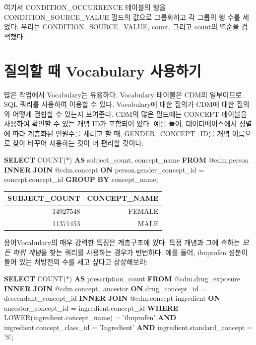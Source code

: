 \documentclass[10.5pt]{book}
\newenvironment{Shaded}{\begin{snugshade}}{\end{snugshade}}
\newcommand{\KeywordTok}[1]{\textcolor[rgb]{0.13,0.29,0.53}{\textbf{#1}}}
\newcommand{\StringTok}[1]{\textcolor[rgb]{0.31,0.60,0.02}{#1}}
\newcommand{\FunctionTok}[1]{\textcolor[rgb]{0.00,0.00,0.00}{#1}}
\newcommand{\NormalTok}[1]{#1}
\theoremstyle{definition}
\theoremstyle{definition}
\theoremstyle{definition}
\theoremstyle{remark}
\begin{document}
여기서 CONDITION\_OCCURRENCE 테이블의 행을 CONDITION\_SOURCE\_VALUE
필드의 값으로 그룹화하고 각 그룹의 행 수를 세었다. 우리는
CONDITION\_SOURCE\_VALUE, count, 그리고 count의 역순을 검색했다.

\section{질의할 때 Vocabulary 사용하기}\label{--vocabulary-}

많은 작업에서 Vocabulary는 유용하다. Vocabulary 테이블은 CDM의
일부이므로 SQL 쿼리를 사용하여 이용할 수 있다. Vocabulary에 대한 질의가
CDM에 대한 질의와 어떻게 결합할 수 있는지 보여준다. CDM의 많은 필드에는
CONCEPT 테이블을 사용하여 확인할 수 있는 개념 ID가 포함되어 있다. 예를
들어, 데이터베이스에서 성별에 따라 계층화된 인원수를 세려고 할 때,
GENDER\_CONCEPT\_ID를 개념 이름으로 찾아 바꾸어 사용하는 것이 더 편리할
것이다:

\begin{Shaded}
\begin{Highlighting}[]
\KeywordTok{SELECT} \FunctionTok{COUNT}\NormalTok{(*) }\KeywordTok{AS}\NormalTok{ subject_count,}
\NormalTok{  concept_name}
\KeywordTok{FROM}\NormalTok{ @cdm.person}
\KeywordTok{INNER} \KeywordTok{JOIN}\NormalTok{ @cdm.concept}
  \KeywordTok{ON}\NormalTok{ person.gender_concept_id = concept.concept_id}
\KeywordTok{GROUP} \KeywordTok{BY}\NormalTok{ concept_name;}
\end{Highlighting}
\end{Shaded}

\begin{longtable}[]{@{}rr@{}}
\toprule
SUBJECT\_COUNT & CONCEPT\_NAME\tabularnewline
\midrule
\endhead
14927548 & FEMALE\tabularnewline
11371453 & MALE\tabularnewline
\bottomrule
\end{longtable}

용어Vocabulary의 매우 강력한 특징은 계층구조에 있다. 특정 개념과 그에
속하는 \emph{모든 하위 개념}을 찾는 쿼리를 사용하는 경우가 빈번하다.
예를 들어, ibuprofen 성분이 들어 있는 처방전의 수를 세고 싶다고
상상해보라:

\begin{Shaded}
\begin{Highlighting}[]
\KeywordTok{SELECT} \FunctionTok{COUNT}\NormalTok{(*) }\KeywordTok{AS}\NormalTok{ prescription_count}
\KeywordTok{FROM}\NormalTok{ @cdm.drug_exposure}
\KeywordTok{INNER} \KeywordTok{JOIN}\NormalTok{ @cdm.concept_ancestor}
  \KeywordTok{ON}\NormalTok{ drug_concept_id = descendant_concept_id}
\KeywordTok{INNER} \KeywordTok{JOIN}\NormalTok{ @cdm.concept ingredient}
  \KeywordTok{ON}\NormalTok{ ancestor_concept_id = ingredient.concept_id}
\KeywordTok{WHERE} \FunctionTok{LOWER}\NormalTok{(ingredient.concept_name) = }\StringTok{'ibuprofen'}
  \KeywordTok{AND}\NormalTok{ ingredient.concept_class_id = }\StringTok{'Ingredient'}
  \KeywordTok{AND}\NormalTok{ ingredient.standard_concept = }\StringTok{'S'}\NormalTok{;}
\end{Highlighting}
\end{Shaded}
\end{document}
